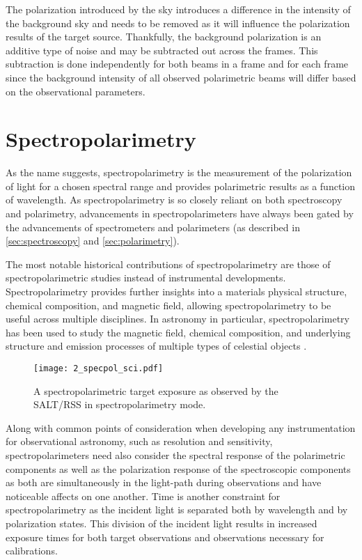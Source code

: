 The polarization introduced by the sky introduces a difference in the intensity of the background sky and needs to be removed as it will influence the polarization results of the target source.
Thankfully, the background polarization is an additive type of noise and may be subtracted out across the frames.
This subtraction is done independently for both beams in a frame and for each frame since the background intensity of all observed polarimetric beams will differ based on the observational parameters.

\section{Spectropolarimetry} \label{sec:spectropolarimetry} %

As the name suggests, spectropolarimetry is the measurement of the polarization of light for a chosen spectral range and provides polarimetric results as a function of wavelength.
As spectropolarimetry is so closely reliant on both spectroscopy and polarimetry, advancements in spectropolarimeters have always been gated by the advancements of spectrometers and polarimeters (as described in \autoref{sec:spectroscopy} and \autoref{sec:polarimetry}).

The most notable historical contributions of spectropolarimetry are those of spectropolarimetric studies instead of instrumental developments.
Spectropolarimetry provides further insights into a materials physical structure, chemical composition, and magnetic field, allowing spectropolarimetry to be useful across multiple disciplines.
In astronomy in particular, spectropolarimetry has been used to study the magnetic field, chemical composition, and underlying structure and emission processes of multiple types of celestial objects \citep[see for example][]{specpol_AGN, specpol_stars, specpol_SN}.

\begin{figure}[t]
    \centering
    \texttt{[image: 2\_specpol\_sci.pdf]}
    \caption{A spectropolarimetric target exposure as observed by the \gls{SALT}/\gls{RSS} in spectropolarimetry mode.}
    \label{fig:specpol_exp}
\end{figure}

Along with common points of consideration when developing any instrumentation for observational astronomy, such as resolution and sensitivity, spectropolarimeters need also consider the spectral response of the polarimetric components as well as the polarization response of the spectroscopic components as both are simultaneously in the light-path during observations and have noticeable affects on one another.
Time is another constraint for spectropolarimetry as the incident light is separated both by wavelength and by polarization states.
This division of the incident light results in increased exposure times for both target observations and observations necessary for calibrations.

